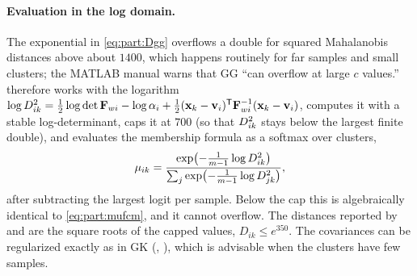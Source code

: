\paragraph{Evaluation in the log domain.} The exponential in \eqref{eq:part:Dgg} overflows a double for squared Mahalanobis distances above about $1400$, which happens routinely for far samples and small clusters; the MATLAB manual warns that GG ``can overflow at large $c$ values.''  therefore works with the logarithm $\log D^2_{ik}=\tfrac12\log\det\mathbf{F}_{wi}-\log\alpha_i+\tfrac12(\mathbf{x}_k-\mathbf{v}_i)^{\mathsf{T}}\mathbf{F}_{wi}^{-1}(\mathbf{x}_k-\mathbf{v}_i)$, computes it with a stable log-determinant, caps it at $700$ (so that $D^2_{ik}$ stays below the largest finite double), and evaluates the membership formula as a softmax over clusters,
\begin{equation}
  \mu_{ik}=\frac{\exp\bigl(-\tfrac{1}{m-1}\log D^2_{ik}\bigr)}{\sum_{j}\exp\bigl(-\tfrac{1}{m-1}\log D^2_{jk}\bigr)},
  \label{eq:part:mugg}
\end{equation}
after subtracting the largest logit per sample. Below the cap this is algebraically identical to \eqref{eq:part:mufcm}, and it cannot overflow. The distances reported by  and  are the square roots of the capped values, $D_{ik}\le e^{350}$. The covariances can be regularized exactly as in GK (, ), which is advisable when the clusters have few samples.

